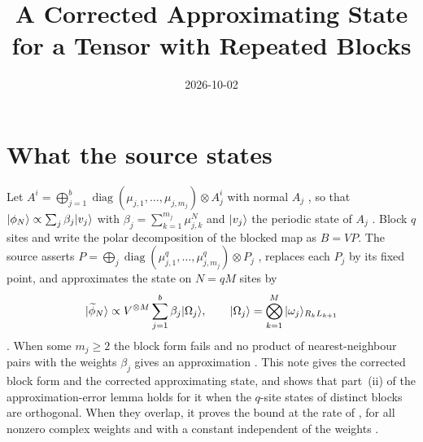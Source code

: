 \documentclass{article}
\title{A Corrected Approximating State for a Tensor with Repeated Blocks}
\author{}
\date{2026-10-02}
\begin{document}
\maketitle
{}

\section{What the source states}
Let $A^i=\bigoplus_{j=1}^b\operatorname{diag}(\mu_{j,1},\dots,\mu_{j,m_j})
    \otimes A_j^i$ with normal $A_j$ \cite[eq.~(S2)]{Malz2024Preparation}, so that
$|\phi_N\rangle\propto\sum_j\beta_j|v_j\rangle$ with
$\beta_j=\sum_{k=1}^{m_j}\mu_{j,k}^N$ and $|v_j\rangle$ the periodic state of
$A_j$ \cite[eqs.~(S3), (S4)]{Malz2024Preparation}. Block $q$ sites and write the
polar decomposition of the blocked map as $B=VP$. The source asserts
$P=\bigoplus_j\operatorname{diag}(\mu_{j,1}^q,\dots,\mu_{j,m_j}^q)\otimes P_j$
\cite[eq.~(S5)]{Malz2024Preparation}, replaces each $P_j$ by its fixed point,
and approximates the state on $N=qM$ sites by
\begin{align}
    |\widetilde\phi_N\rangle\propto V^{\otimes M}\sum_{j=1}^b\beta_j|\Omega_j\rangle,
    \qquad |\Omega_j\rangle=\bigotimes_{k=1}^M|\omega_j\rangle_{R_kL_{k+1}}
    \label{eq:mswc24_rc_source_state}
\end{align}
\cite[eq.~(S7)]{Malz2024Preparation}. When some $m_j\geq2$ the block form fails
and no product of nearest-neighbour pairs with the weights $\beta_j$ gives an
approximation \cite{gap:mswc24_multiplicity_fixed_point}. This note gives the
corrected block form and the corrected approximating state, and shows that
part~(ii) of the approximation-error lemma holds for it when the $q$-site states
of distinct blocks are orthogonal. When they overlap, it proves the bound at the rate
of \cite{gap:mswc24_block_form_mixed_overlap}, for all nonzero complex weights and with a
constant independent of the weights \cite{gap:mswc24_repeated_overlap_small_weight_sum}.
\end{document}
